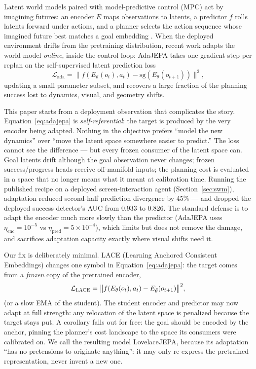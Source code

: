 \documentclass{article}
\newcommand{\lace}{\textsc{LACE}}
\newcommand{\lovelace}{LovelaceJEPA}
\newcommand{\sg}{\mathrm{sg}}
\newcommand{\Estud}{E_{\theta}}
\newcommand{\Efroz}{E_{\bar\theta}}
\begin{document}
Latent world models paired with model-predictive control (MPC) act by
imagining futures: an encoder $E$ maps observations to latents, a predictor
$f$ rolls latents forward under actions, and a planner selects the action
sequence whose imagined future best matches a goal embedding
\citep{ha2018world,hafner2020dreamer,zhou2024dinowm}. When the deployed
environment drifts from the pretraining distribution, recent work adapts the
world model \emph{online}, inside the control loop: AdaJEPA
\citep{anonymous2026adajepa} takes one gradient step per replan on the
self-supervised latent prediction loss
%
\begin{equation}
\mathcal{L}_{\text{ada}}
  = \big\| f(\Estud(o_t), a_t) - \sg(\Estud(o_{t+1})) \big\|^2 ,
\label{eq:adajepa}
\end{equation}
%
updating a small parameter subset, and recovers a large fraction of the
planning success lost to dynamics, visual, and geometry shifts.

This paper starts from a deployment observation that complicates the story.
Equation~\eqref{eq:adajepa} is \emph{self-referential}: the target is produced
by the very encoder being adapted. Nothing in the objective prefers ``model
the new dynamics'' over ``move the latent space somewhere easier to
predict.'' The loss cannot see the difference --- but every frozen consumer of
the latent space can. Goal latents drift although the goal observation never
changes; frozen success/progress heads receive off-manifold inputs; the
planning cost is evaluated in a space that no longer means what it meant at
calibration time. Running the published recipe on a deployed
screen-interaction agent (Section~\ref{sec:swm}), adaptation reduced
second-half prediction divergence by 45\% --- and dropped the deployed
success detector's AUC from 0.933 to 0.826. The standard defense is to adapt
the encoder much
more slowly than the predictor (AdaJEPA uses $\eta_{\text{enc}} = 10^{-5}$ vs
$\eta_{\text{pred}} = 5\times10^{-4}$), which limits but does not remove the
damage, and sacrifices adaptation capacity exactly where visual shifts need
it.

Our fix is deliberately minimal. \lace{} (Learning Anchored Consistent
Embeddings) changes one symbol in Equation~\eqref{eq:adajepa}: the target
comes from a \emph{frozen} copy of the pretrained encoder,
%
\begin{equation}
\mathcal{L}_{\lace}
  = \big\| f(\Estud(o_t), a_t) - \Efroz(o_{t+1}) \big\|^2 ,
\label{eq:lace}
\end{equation}
%
(or a slow EMA of the student). The student encoder and predictor may now
adapt at full strength: any relocation of the latent space is penalized
because the target stays put. A corollary falls out for free: the goal should
be encoded by the anchor, pinning the planner's cost landscape to the space
its consumers were calibrated on. We call the resulting model \lovelace{},
because its adaptation ``has no pretensions to originate anything'': it may
only re-express the pretrained representation, never invent a new one.
\end{document}
